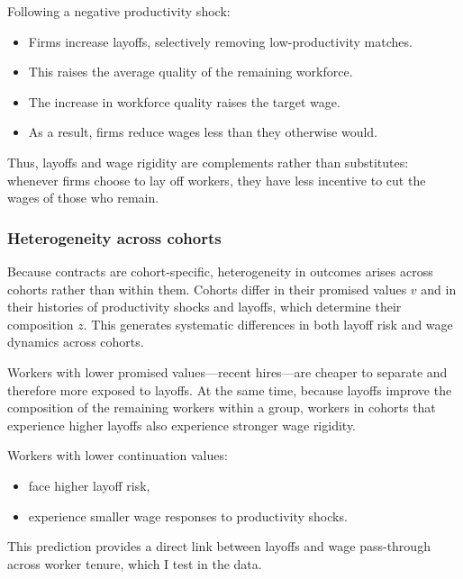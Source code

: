 \begin{proposition}
Following a negative productivity shock:
\begin{itemize}
\item Firms increase layoffs, selectively removing low-productivity matches.
\item This raises the average quality of the remaining workforce.
\item The increase in workforce quality raises the target wage.
\item As a result, firms reduce wages less than they otherwise would.
\end{itemize}
\end{proposition}

Thus, layoffs and wage rigidity are complements rather than substitutes: whenever firms choose to lay off workers, they have less incentive to cut the wages of those who remain.

\subsubsection*{Heterogeneity across cohorts}

Because contracts are cohort-specific, heterogeneity in outcomes arises across cohorts rather than within them. Cohorts differ in their promised values $v$ and in their histories of productivity shocks and layoffs, which determine their composition $z$. This generates systematic differences in both layoff risk and wage dynamics across cohorts.

Workers with lower promised values—recent hires—are cheaper to separate and therefore more exposed to layoffs. At the same time, because layoffs improve the composition of the remaining workers within a group, workers in cohorts that experience higher layoffs also experience stronger wage rigidity.

\begin{proposition}
Workers with lower continuation values:
\begin{itemize}
\item face higher layoff risk,
\item experience smaller wage responses to productivity shocks.
\end{itemize}
\end{proposition}

This prediction provides a direct link between layoffs and wage pass-through across worker tenure, which I test in the data.